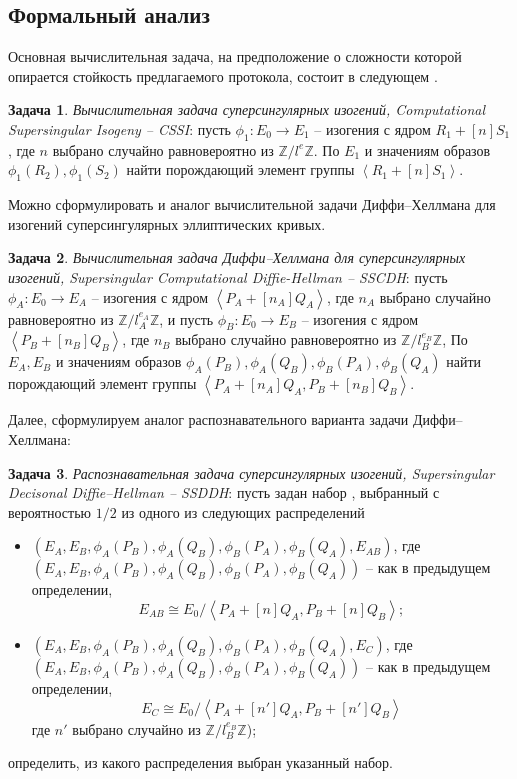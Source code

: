 \documentclass[a4paper,12pt]{article}
\newcommand{\ZZ}{\mathbb{Z}}
\newcommand{\tr}[1]{\left\langle #1\right\rangle}
\theoremstyle{definition}
\newtheorem{problem}{Задача}
\begin{document}
\subsection{Формальный анализ}

Основная вычислительная задача, на предположение о сложности которой опирается стойкость предлагаемого протокола, состоит в следующем \cite{DF}.

\begin{problem}\label{problem31} \emph{Вычислительная задача суперсингулярных изогений, Computational Supersingular Isogeny -- CSSI}: пусть $\phi_1: E_0 \to E_1$ -- изогения с ядром
$R_1 + [n]S_1$, где   $n $ выбрано случайно равновероятно из $\ZZ/l^{e}\ZZ$. По $E_1$ и значениям образов $\phi_1(R_2), \phi_1(S_2)$ найти порождающий элемент группы $\tr{R_1+[n]S_1}$.
\end{problem}

Можно сформулировать и аналог вычислительной задачи Диффи--Хеллмана для изогений суперсингулярных эллиптических кривых.

\begin{problem}\label{problem32} \emph{Вычислительная задача Диффи--Хеллмана для суперсингулярных изогений, Supersingular Computational Diffie-Hellman --  SSCDH}: 
пусть $\phi_A: E_0 \to E_A$ -- изогения с ядром $\tr{P_A+[n_A]Q_A}$, где   $n_A $ выбрано случайно равновероятно из $\ZZ/l_A^{e_A}\ZZ$,
и пусть $\phi_B: E_0 \to E_B$ -- изогения с ядром $\tr{P_B+[n_B]Q_B}$, где   $n_B $ выбрано случайно равновероятно из $\ZZ/l_B^{e_B}\ZZ$,
По $E_A,E_B$ и значениям образов $\phi_A(P_B), \phi_A(Q_B), \phi_B(P_A), \phi_B(Q_A)$ найти порождающий элемент группы $\tr{P_A+[n_A]Q_A, P_B+[n_B]Q_B}$.
\end{problem}

Далее, сформулируем аналог распознавательного варианта задачи Диффи--Хеллмана: 

 \begin{problem}\label{problem8} \emph{Распознавательная задача суперсингулярных изогений, Supersingular Decisonal Diffie--Hellman -- SSDDH}: пусть задан набор , выбранный с вероятностью $1/2$ из одного из следующих распределений
\begin{itemize}
\item $(E_A,E_B,\phi_A(P_B), \phi_A(Q_B), \phi_B(P_A), \phi_B(Q_A),E_{AB})$, где\\ $(E_A,E_B,\phi_A(P_B), \phi_A(Q_B), \phi_B(P_A), \phi_B(Q_A))$ -- как в предыдущем определении,
$$
E_{AB} \cong E_0/\tr{P_A+[n]Q_A, P_B+[n]Q_B};
$$
\item $(E_A,E_B,\phi_A(P_B), \phi_A(Q_B), \phi_B(P_A), \phi_B(Q_A),E_{C})$, где\\  $(E_A,E_B,\phi_A(P_B), \phi_A(Q_B), \phi_B(P_A), \phi_B(Q_A))$ --  как в предыдущем определении,  
$$
E_C \cong E_0/\tr{P_A+[n']Q_A, P_B+[n']Q_B}
$$
где $ n'$ выбрано случайно из $\ZZ/l_B^{e_B}\ZZ$);
\end{itemize}
определить, из какого распределения выбран указанный набор. 
\end{problem}
\end{document}
